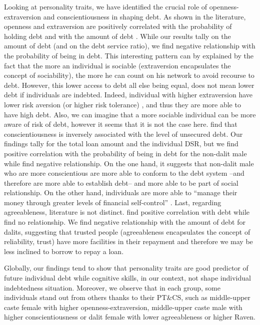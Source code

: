\documentclass[a4paper, 11pt, onecolumn]{article}
\newcommand{\aebe}{all else being equal}
\newcommand{\PTCS}{PT\&CS}
\begin{document}
Looking at personality traits, we have identified the crucial role of openness-extraversion and conscientiousness in shaping debt.
As shown in the literature, openness and extraversion are positively correlated with the probability of holding debt and with the amount of debt \citep{Brown2014}.
While our results tally on the amount of debt (and on the debt service ratio), we find negative relationship with the probability of being in debt.
This interesting pattern can by explained by the fact that the more an individual is sociable (extraversion encapsulates the concept of sociability), the more he can count on his network to avoid recourse to debt.
However, this lower access to debt \aebe, does not mean lower debt if individuals are indebted.
Indeed, individual with higher extraversion have lower risk aversion (or higher risk tolerance) \citep{Pinjisakikool2017b}, and thus they are more able to have high debt.
Also, we can imagine that a more sociable individual can be more aware of risk of debt, however it seems that it is not the case here.
\cite{Brown2014, Donnelly2012} find that conscientiousness is inversely associated with the level of unsecured debt.
Our findings tally for the total loan amount and the individual DSR, but we find positive correlation with the probability of being in debt for the non-dalit male while \cite{Nyhus2001, Brown2014} find negative relationship.
On the one hand, it suggests that non-dalit male who are more conscientious are more able to conform \citep{DeYoung2002} to the debt system --and therefore are more able to establish debt-- and more able to be part of social relationship.
On the other hand, individuals are more able to ``manage their money through greater levels of financial self-control'' \citep{Brown2014}.
Last, regarding agreeableness, literature is not distinct.
\cite{Brown2014} find positive correlation with debt while \cite{Nyhus2001} find no relationship.
We find negative relationship with the amount of debt for dalits, suggesting that trusted people (agreeableness encapsulates the concept of reliability, trust) have more facilities in their repayment and therefore we may be less inclined to borrow to repay a loan. 

Globally, our findings tend to show that personality traits are good predictor of future individual debt while cognitive skills, in our context, not shape individual indebtedness situation.
Moreover, we observe that in each group, some individuals stand out from others thanks to their \PTCS, such as 
middle-upper caste female with higher openness-extraversion, middle-upper caste male with higher conscientiousness or dalit female with lower agreeableness or higher Raven.
\end{document}
